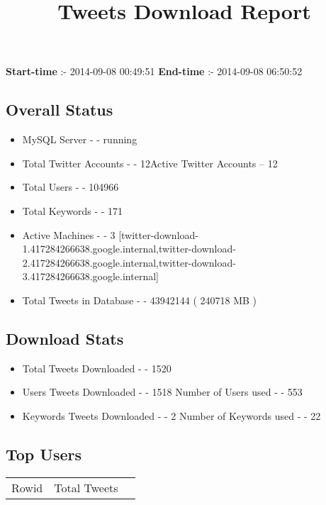 \documentclass{article}\usepackage[T1]{fontenc}
\begin{document}
\title{\textbf{Tweets Download Report}}
               \date{}
                \maketitle
               \centerline{\textbf{Start-time} :- 2014-09-08 00:49:51 \hspace{40pt} \textbf{End-time} :- 2014-09-08 06:50:52}               \subsection*{Overall Status}                \begin{itemize}                \item MySQL Server - - running               \item Total Twitter Accounts - - 12\newline Active Twitter Accounts -- 12               \item Total Users - - 104966               \item Total Keywords - - 171               \item Active Machines - - 3 [twitter-download-1.417284266638.google.internal,twitter-download-2.417284266638.google.internal,twitter-download-3.417284266638.google.internal]               \item Total Tweets in Database - - 43942144 ( 240718 MB )               \end{itemize}               \subsection*{Download Stats}                \begin{itemize}                \item Total Tweets Downloaded - - 1520               \item Users Tweets Downloaded - - 1518 \newline Number of Users used - - 553               \item Keywords Tweets Downloaded - - 2 \newline Number of Keywords used - - 22              \end{itemize}              \subsection*{Top Users}\begin{tabular}{|c|c|c|}         \hline         Rowid & Total Tweets \\ 

\end{tabular}
\end{document}
